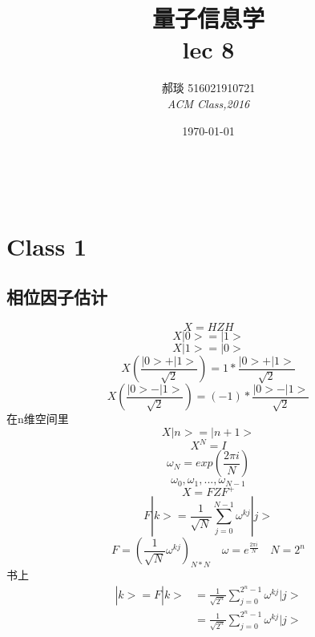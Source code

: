 \documentclass[a4paper, 11pt]{article} %
\title{\textbf{量子信息学}\\ %
lec 8} %
\author{\textsc{郝琰 516021910721} %
\\{\textit{ACM Class,2016}}} %
\date{\today} %
\makeatletter
\renewcommand{\maketitle}{ %

\begin{flushright} %
{\LARGE\@title} %

\vspace{50pt} %

{\large\@author} %
\\\@date %

\vspace{10pt} %
\end{flushright}
}
\makeatother
\begin{document}
\maketitle
\section{Class 1}
\subsection{相位因子估计}
$$
X = HZH
$$
$$
X|0> = |1>
$$
$$
X|1> = |0>
$$
$$
X(\frac{|0>+|1>}{\sqrt{2}}) = 1*\frac{|0>+|1>}{\sqrt{2}}
$$
$$
X(\frac{|0>-|1>}{\sqrt{2}}) = (-1)*\frac{|0>-|1>}{\sqrt{2}}
$$
在n维空间里
$$
X|n> = |n+1>
$$
$$
X^N = I
$$
$$
\omega_N = exp(\frac{2\pi i}{N})
$$
$$
\omega_0,\omega_1,...,\omega_{N-1}
$$
$$
X = FZF^{+}
$$
$$
F|k> = \frac{1}{\sqrt{N}}\sum_{j=0}^{N-1} \omega^{kj}|j>
$$
$$
F = (\frac{1}{\sqrt{N}}\omega^{kj})_{N*N} \quad \omega = e^{\frac{2\pi i}{N}} \quad N = 2^n
$$
书上
$$
\begin{align*}
|\hat{k}> = F|k> &= \frac{1}{\sqrt{2^n}}\sum_{j=0}^{2^n-1}\omega^{kj}|j> \\
& = \frac{1}{\sqrt{2^n}}\sum_{j=0}^{2^n-1}\omega^{kj}|j> 
\end{align*}
$$
\end{document}
